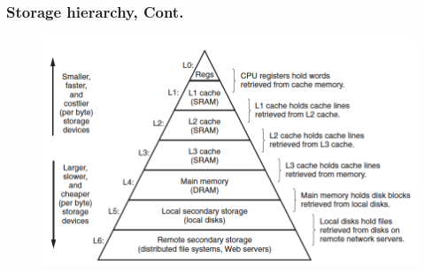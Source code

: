 \documentclass[10pt,svgnames,fragile]{beamer}
\begin{document}
\begin{frame}
	\frametitle{Storage hierarchy, Cont.}
	\begin{figure}[h]
		\includegraphics[width=0.99\linewidth]{images/Storage.png}
	\end{figure}
\end{frame}
\end{document}
